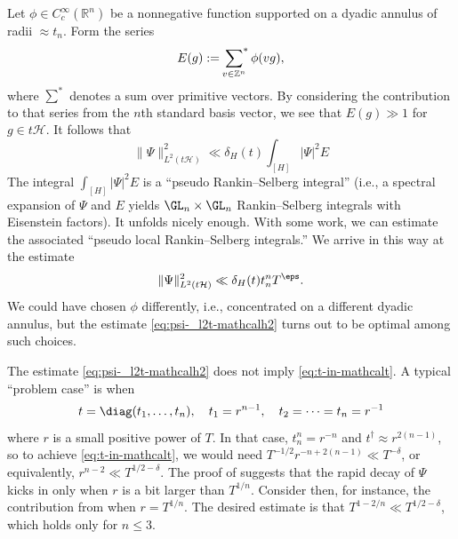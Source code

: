 Let $\phi \in C_c^\infty(\mathbb{R}^n)$ be a nonnegative function supported on a dyadic annulus of radii $\approx t_n$.  Form the series
\begin{equation*}
  E(g) := \sideset{}{^*}\sum_{v \in \mathbb{Z}^n} \phi(v g),
\end{equation*}
where $\sum^*$ denotes a sum over primitive vectors.  By considering the contribution to that series from the $n$th standard basis vector, we see that $E(g) \gg 1$ for $g \in t \mathcal{H}$.  It follows that
\begin{equation*}
  \|\Psi \|^2_{L^2(t \mathcal{H})} \ll \delta_H(t) \int_{[H]} |\Psi|^2 E
\end{equation*}
The integral $\int_{[H]} |\Psi|^2 E$ is a ``pseudo Rankin--Selberg integral'' (i.e., a spectral expansion of $\Psi$ and $E$ yields $\GL_n \times \GL_n$ Rankin--Selberg integrals with Eisenstein factors).  It unfolds nicely enough.  With some work, we can estimate the associated ``pseudo local Rankin--Selberg integrals.''  We arrive in this way at the estimate
\begin{equation}\label{eq:psi-_l2t-mathcalh2}
  \|\Psi \|_{L^2(t \mathcal{H})}^2 \ll \delta_H(t) t_n^n T^{\eps}.
\end{equation}
We could have chosen $\phi$ differently, i.e., concentrated on a different dyadic annulus, but the estimate \eqref{eq:psi-_l2t-mathcalh2} turns out to be optimal among such choices.

The estimate \eqref{eq:psi-_l2t-mathcalh2} does not imply \eqref{eq:t-in-mathcalt}.  A typical ``problem case'' is when
\begin{equation}\label{eq:t-=-diagt_1}
  t = \diag(t_1,\dotsc,t_n),
  \quad
  t_1 = r^{n-1}, \quad
  t_2 = \dotsb = t_n = r^{-1}
\end{equation}
where $r$ is a small positive power of $T$.  In that case, $t_n^n = r^{-n}$ and $t^\dagger \approx r^{2 (n-1)}$, so to achieve \eqref{eq:t-in-mathcalt}, we would need $T^{-1/2} r^{-n + 2 (n - 1)} \ll T^{-\delta}$, or equivalently, $r^{n - 2} \ll T^{1/2 - \delta}$.  The proof of \cite[Thm 3]{MR4093914} suggests that the rapid decay of $\Psi$ kicks in only when $r$ is a bit larger than $T^{1/n}$.  Consider then, for instance, the contribution from when $r = T^{1/n}$.  The desired estimate is that $T^{1 - 2/n} \ll T^{1/2 - \delta}$, which holds only for $n \leq 3$.

